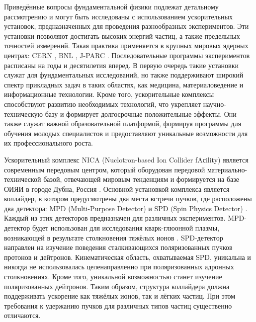 \par	Приведённые вопросы фундаментальной физики подлежат детальному рассмотрению и могут быть исследованы с использованием ускорительных установок, предназначенных для проведения разнообразных экспериментов. Эти установки позволяют достигать высоких энергий частиц, а также предельных точностей измерений. Такая практика применяется в крупных мировых ядерных центрах: CERN \cite{lhc:heavy_ions}, BNL \cite{rhic:design}, J-PARC \cite{j-park}. Последовательные программы экспериментов расписаны на годы и десятилетия вперед. В первую очередь такие установки служат для фундаментальных исследований, но также поддерживают широкий спектр прикладных задач в таких областях, как медицина, материаловедение и информационные технологии. Кроме того, ускорительные комплексы способствуют развитию необходимых технологий, что укрепляет научно-техническую базу и формирует долгосрочные положительные эффекты. Они также служат важной образовательной платформой, формируя программы для обучения молодых специалистов и предоставляют уникальные возможности для их профессионального роста. 

\par	Ускорительный комплекс NICA (Nuclotron-based Ion Collider fAсility) является современным передовым центром, который оборудован передовой материально-технической базой, отвечающей мировым тенденциям и формируется на базе ОИЯИ в городе Дубна, Россия \cite{nuclotron24}. Основной установкой комплекса является коллайдер, в котором предусмотрены два места встречи пучков, где расположены два детектора: MPD (Multi-Purpose Detector) и SPD (Spin Physics Detector) \cite{Ladygin:SPD}. Каждый из этих детекторов предназначен для различных экспериментов. MPD-детектор будет использован для исследования кварк-глюонной плазмы, возникающей в результате столкновения тяжёлых ионов \cite{MPD, Tech_NICA}. SPD-детектор направлен на изучение поведения сталкивающихся поляризованных пучков протонов и дейтронов. Кинематическая область, охватываемая SPD, уникальна и никогда не использовалась целенаправленно при поляризованных адронных столкновениях. Кроме того, уникальной возможностью станет изучение поляризованных дейтронов. Таким образом, структура коллайдера должна поддерживать ускорение как тяжёлых ионов, так и лёгких частиц. При этом требования к удержанию пучков для различных типов частиц существенно отличаются.

